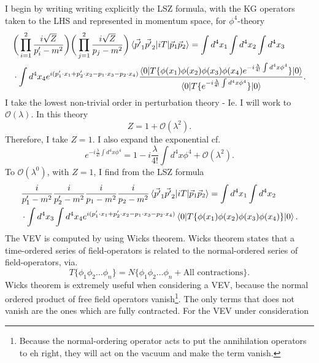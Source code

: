 \begin{example}
\begin{enumerate}
		I begin by writing writing explicitly the LSZ formula, with the KG operators taken to the LHS and represented in momentum space, for $\phi^4$-theory
		\begin{equation}
			\begin{split}
				&\bigg(\prod_{i=1}^{2}\frac{i\sqrt{Z}}{p'_i-m^2}\bigg)\bigg(\prod_{j=1}^{2}\frac{i\sqrt{Z}}{p_j-m^2}\bigg)\braket{\vec{p'}_1\vec{p'}_2|iT|\vec{p}_1\vec{p}_2}=\int d^4x_1\int d^4x_2\int d^4x_3\\
				&\cdot \int d^4x_4e^{i(p'_1\cdot x_1+p'_2\cdot x_2-p_1\cdot x_3-p_2\cdot x_4)}\frac{\braket{0|T\{\phi(x_1)\phi(x_2)\phi(x_3)\phi(x_4)e^{-i\frac{\lambda}{4!}\int d^4x\phi^4}\}|0}}{\braket{0|T\{e^{-i\frac{\lambda}{4!}\int d^4x \phi^4}\}|0}}.
			\end{split}
		\end{equation}  
		I take the lowest non-trivial order in perturbation theory - Ie. I will work to $\mathcal{O}(\lambda)$. In this theory
		\begin{equation}
			Z=1+\mathcal{O}(\lambda^2).
		\end{equation} 
		Therefore, I take $Z=1$. I also expand the exponential cf.
		\begin{equation}
			e^{-i\frac{\lambda}{4!}\int d^4x \phi^4}=1-i\frac{\lambda}{4!}\int d^4x\phi^4+\mathcal{O}(\lambda^2).
		\end{equation} 
		To $\mathcal{O}(\lambda^0)$, with $Z=1$, I find from the LSZ formula
		\begin{equation}
			\begin{split}
				&\frac{i}{p'_1-m^2}\frac{i}{p'_2-m^2}\frac{i}{p_1-m^2}\frac{i}{p_2-m^2}\braket{\vec{p'}_1\vec{p'}_2|iT|\vec{p}_1\vec{p}_2}=\int d^4x_1\int d^4x_2\\
				&\cdot \int d^4x_3\int d^4x_4e^{i(p'_1\cdot x_1+p'_2\cdot x_2-p_1\cdot x_3-p_2\cdot x_4)}\braket{0|T\{\phi(x_1)\phi(x_2)\phi(x_3)\phi(x_4)\}|0}.
			\end{split}
		\end{equation}  
		The VEV is computed by using Wicks theorem. Wicks theorem states that a time-ordered series of field-operators is related to the normal-ordered series of field-operators, via.
		\begin{equation}
			T\{\phi_1\phi_2\dots\phi_n\}=N\{\phi_1\phi_2\dots\phi_n+\text{All contractions}\}.
		\end{equation} 
		Wicks theorem is extremely useful when considering a VEV, because the normal ordered product of free field operators vanish\footnote{Because the normal-ordering operator acts to put the annihilation operators to eh right, they will act on the vacuum and make the term vanish.}. The only terms that does not vanish are the ones which are fully contracted. For the VEV under consideration

\end{enumerate}
\end{example}
